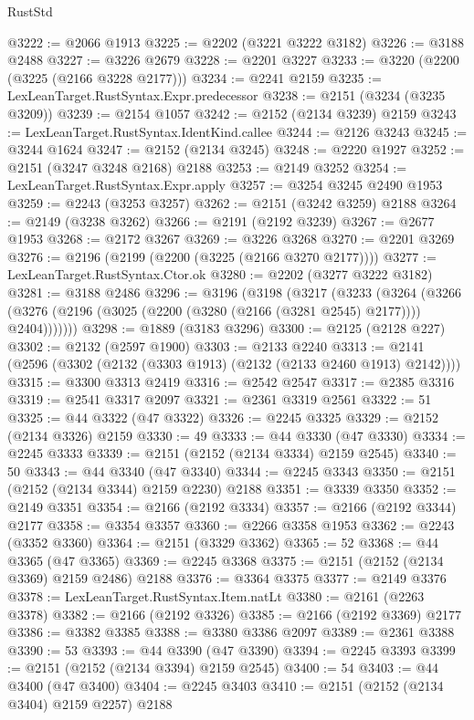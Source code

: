 \begin{lexlean}{RustStd}
\begin{coremodule}
@3222 := @2066 @1913
@3225 := @2202 (@3221 @3222 @3182)
@3226 := @3188 @2488
@3227 := @3226 @2679
@3228 := @2201 @3227
@3233 := @3220 (@2200 (@3225 (@2166 @3228 @2177)))
@3234 := @2241 @2159
@3235 := LexLeanTarget.RustSyntax.Expr.predecessor
@3238 := @2151 (@3234 (@3235 @3209))
@3239 := @2154 @1057
@3242 := @2152 (@2134 @3239) @2159
@3243 := LexLeanTarget.RustSyntax.IdentKind.callee
@3244 := @2126 @3243
@3245 := @3244 @1624
@3247 := @2152 (@2134 @3245)
@3248 := @2220 @1927
@3252 := @2151 (@3247 @3248 @2168) @2188
@3253 := @2149 @3252
@3254 := LexLeanTarget.RustSyntax.Expr.apply
@3257 := @3254 @3245 @2490 @1953
@3259 := @2243 (@3253 @3257)
@3262 := @2151 (@3242 @3259) @2188
@3264 := @2149 (@3238 @3262)
@3266 := @2191 (@2192 @3239)
@3267 := @2677 @1953
@3268 := @2172 @3267
@3269 := @3226 @3268
@3270 := @2201 @3269
@3276 := @2196 (@2199 (@2200 (@3225 (@2166 @3270 @2177))))
@3277 := LexLeanTarget.RustSyntax.Ctor.ok
@3280 := @2202 (@3277 @3222 @3182)
@3281 := @3188 @2486
@3296 := @3196
    (@3198
      (@3217
        (@3233
          (@3264
            (@3266 (@3276 (@2196 (@3025 (@2200 (@3280 (@2166 (@3281 @2545) @2177)))) @2404)))))))
@3298 := @1889 (@3183 @3296)
@3300 := @2125 (@2128 @227)
@3302 := @2132 (@2597 @1900)
@3303 := @2133 @2240
@3313 := @2141 (@2596 (@3302 (@2132 (@3303 @1913) (@2132 (@2133 @2460 @1913) @2142))))
@3315 := @3300 @3313 @2419
@3316 := @2542 @2547
@3317 := @2385 @3316
@3319 := @2541 @3317 @2097
@3321 := @2361 @3319 @2561
@3322 := 51
@3325 := @44 @3322 (@47 @3322)
@3326 := @2245 @3325
@3329 := @2152 (@2134 @3326) @2159
@3330 := 49
@3333 := @44 @3330 (@47 @3330)
@3334 := @2245 @3333
@3339 := @2151 (@2152 (@2134 @3334) @2159 @2545)
@3340 := 50
@3343 := @44 @3340 (@47 @3340)
@3344 := @2245 @3343
@3350 := @2151 (@2152 (@2134 @3344) @2159 @2230) @2188
@3351 := @3339 @3350
@3352 := @2149 @3351
@3354 := @2166 (@2192 @3334)
@3357 := @2166 (@2192 @3344) @2177
@3358 := @3354 @3357
@3360 := @2266 @3358 @1953
@3362 := @2243 (@3352 @3360)
@3364 := @2151 (@3329 @3362)
@3365 := 52
@3368 := @44 @3365 (@47 @3365)
@3369 := @2245 @3368
@3375 := @2151 (@2152 (@2134 @3369) @2159 @2486) @2188
@3376 := @3364 @3375
@3377 := @2149 @3376
@3378 := LexLeanTarget.RustSyntax.Item.natLt
@3380 := @2161 (@2263 @3378)
@3382 := @2166 (@2192 @3326)
@3385 := @2166 (@2192 @3369) @2177
@3386 := @3382 @3385
@3388 := @3380 @3386 @2097
@3389 := @2361 @3388
@3390 := 53
@3393 := @44 @3390 (@47 @3390)
@3394 := @2245 @3393
@3399 := @2151 (@2152 (@2134 @3394) @2159 @2545)
@3400 := 54
@3403 := @44 @3400 (@47 @3400)
@3404 := @2245 @3403
@3410 := @2151 (@2152 (@2134 @3404) @2159 @2257) @2188

\end{coremodule}
\end{lexlean}
